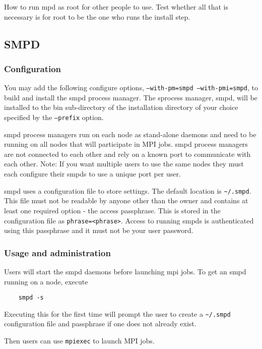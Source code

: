 \documentclass[dvipdfm,11pt]{article}
\begin{document}
How to run mpd as root for other people to use.  Test whether all that
is necessary is for root to be the one who runs the install step.

\subsection{SMPD}
\label{sec:smpd}

\subsubsection{Configuration}
\label{sec:smpd_configure}

You may add the following configure options, 
\texttt{--with-pm=smpd --with-pmi=smpd}, 
to build and install the smpd process manager. The sprocess manager, smpd, 
will be installed to the bin sub-directory of the installation directory 
of your choice specified by the \texttt{--prefix} option.

smpd process managers run on each node as stand-alone daemons and need to
be running on all nodes that will participate in MPI jobs.  smpd process 
managers are not connected to each other and rely on a known port to 
communicate with each other.  Note: If you want multiple users to use the 
same nodes they must each configure their smpds to use a unique port per 
user. 

smpd uses a configuration file to store settings.  The default location is 
\verb+~/.smpd+.  This file must not be readable by anyone other than 
the owner and contains at least one required option - the access passphrase.
This is stored in the configuration file as \texttt{phrase=<phrase>}. Access 
to running smpds is authenticated using this passphrase and it must 
not be your user password.

\subsubsection{Usage and administration}
\label{sec:smpd_usage}

Users will start the smpd daemons before launching mpi jobs.  To get an 
smpd running on a node, execute 
\begin{verbatim}
    smpd -s
\end{verbatim}
Executing this for the first time will prompt the user to create a 
\verb+~/.smpd+ configuration file and passphrase if one does not 
already exist.

Then users can use \texttt{mpiexec} to launch MPI jobs.
\end{document}
